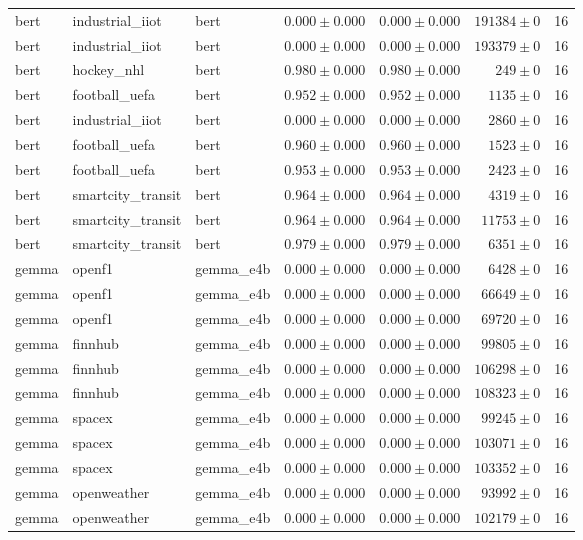 \begin{table}[htbp]
\begin{tabular}{l l l r r r r}
bert & industrial\_iiot & bert & $0.000\pm0.000$ & $0.000\pm0.000$ & $191384\pm0$ & 16 \\
bert & industrial\_iiot & bert & $0.000\pm0.000$ & $0.000\pm0.000$ & $193379\pm0$ & 16 \\
bert & hockey\_nhl & bert & $0.980\pm0.000$ & $0.980\pm0.000$ & $249\pm0$ & 16 \\
bert & football\_uefa & bert & $0.952\pm0.000$ & $0.952\pm0.000$ & $1135\pm0$ & 16 \\
bert & industrial\_iiot & bert & $0.000\pm0.000$ & $0.000\pm0.000$ & $2860\pm0$ & 16 \\
bert & football\_uefa & bert & $0.960\pm0.000$ & $0.960\pm0.000$ & $1523\pm0$ & 16 \\
bert & football\_uefa & bert & $0.953\pm0.000$ & $0.953\pm0.000$ & $2423\pm0$ & 16 \\
bert & smartcity\_transit & bert & $0.964\pm0.000$ & $0.964\pm0.000$ & $4319\pm0$ & 16 \\
bert & smartcity\_transit & bert & $0.964\pm0.000$ & $0.964\pm0.000$ & $11753\pm0$ & 16 \\
bert & smartcity\_transit & bert & $0.979\pm0.000$ & $0.979\pm0.000$ & $6351\pm0$ & 16 \\
gemma & openf1 & gemma\_e4b & $0.000\pm0.000$ & $0.000\pm0.000$ & $6428\pm0$ & 16 \\
gemma & openf1 & gemma\_e4b & $0.000\pm0.000$ & $0.000\pm0.000$ & $66649\pm0$ & 16 \\
gemma & openf1 & gemma\_e4b & $0.000\pm0.000$ & $0.000\pm0.000$ & $69720\pm0$ & 16 \\
gemma & finnhub & gemma\_e4b & $0.000\pm0.000$ & $0.000\pm0.000$ & $99805\pm0$ & 16 \\
gemma & finnhub & gemma\_e4b & $0.000\pm0.000$ & $0.000\pm0.000$ & $106298\pm0$ & 16 \\
gemma & finnhub & gemma\_e4b & $0.000\pm0.000$ & $0.000\pm0.000$ & $108323\pm0$ & 16 \\
gemma & spacex & gemma\_e4b & $0.000\pm0.000$ & $0.000\pm0.000$ & $99245\pm0$ & 16 \\
gemma & spacex & gemma\_e4b & $0.000\pm0.000$ & $0.000\pm0.000$ & $103071\pm0$ & 16 \\
gemma & spacex & gemma\_e4b & $0.000\pm0.000$ & $0.000\pm0.000$ & $103352\pm0$ & 16 \\
gemma & openweather & gemma\_e4b & $0.000\pm0.000$ & $0.000\pm0.000$ & $93992\pm0$ & 16 \\
gemma & openweather & gemma\_e4b & $0.000\pm0.000$ & $0.000\pm0.000$ & $102179\pm0$ & 16 \\

\end{tabular}
\end{table}
